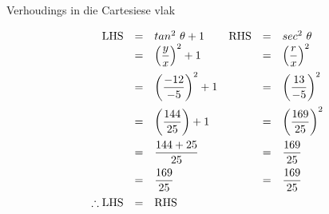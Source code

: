 \begin{wex}{Verhoudings in die Cartesiese vlak}
{
\begin{equation*}
\begin{array}{rclrcl}
 \hfill \mbox{LHS} &=&  tan^{2}~\theta + 1 	&	\mbox{RHS}	&=&  	sec^{2}~\theta \hfill \\
\hfill &=& \left(\dfrac{y}{x}\right)^{2} + 1  	&	&=&  \left(\dfrac{r}{x}\right)^{2} \hfill \vspace{5pt} \\
\hfill&=&  \left(\dfrac{-12}{-5}\right)^{2} + 1 	&	&=&  \left(\dfrac{13}{-5}\right)^{2} \hfill \vspace{5pt}\\
\hfill&=&  \left (\dfrac{144}{25}\right) + 1  	&	&=&  \left(\dfrac{169}{25}\right)^{2} \hfill \vspace{5pt}\\
\hfill &=& \dfrac{144 + 25}{25} 		&	&=&  \dfrac{169}{25} \hfill \vspace{5pt}\\
\hfill &=& \dfrac{169}{25}  			&	&=&  \dfrac{169}{25} \hfill \vspace{5pt}\\
\hfill \therefore \mbox{LHS} &=& \mbox{RHS}&& \hfill

\end{array}
\end{equation*}

}
\end{wex}


